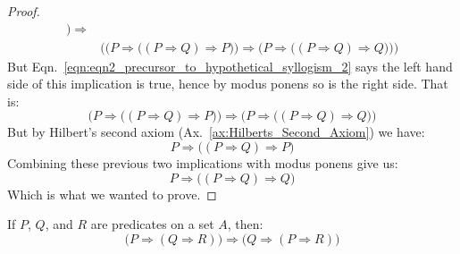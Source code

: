 \begin{proof}
\begin{equation}
\begin{split}
                \Big)
                \Rightarrow\\
                &\bigg(
                    \Big(
                        P\Rightarrow
                        \big(
                            (P\Rightarrow{Q})\Rightarrow{P}
                        \big)
                    \Big)
                    \Rightarrow
                    \Big(
                        P\Rightarrow
                        \big(
                            (P\Rightarrow{Q})\Rightarrow{Q}
                        \big)
                    \Big)
                \bigg)
            \end{split}
        \end{equation}
        But Eqn.~\ref{eqn:eqn2_precursor_to_hypothetical_syllogism_2} says the
        left hand side of this implication is true, hence by modus ponens so is
        the right side. That is:
        \begin{equation}
            \Big(
                P\Rightarrow
                \big(
                    (P\Rightarrow{Q})\Rightarrow{P}
                \big)
            \Big)
            \Rightarrow
            \Big(
                P\Rightarrow
                \big(
                    (P\Rightarrow{Q})\Rightarrow{Q}
                \big)
            \Big)
        \end{equation}
        But by Hilbert's second axiom (Ax.~\ref{ax:Hilberts_Second_Axiom}) we
        have:
        \begin{equation}
            P\Rightarrow\big((P\Rightarrow{Q})\Rightarrow{P}\big)
        \end{equation}
        Combining these previous two implications with modus ponens give us:
        \begin{equation}
            P\Rightarrow
            \big(
                (P\Rightarrow{Q})\Rightarrow{Q}
            \big)
        \end{equation}
        Which is what we wanted to prove.
    \end{proof}
    \begin{theorem}
        \label{thm:precursor_to_hypothetical_syllogism_2}%
        If $P$, $Q$, and $R$ are predicates on a set $A$, then:
        \begin{equation*}
            \big(P\Rightarrow(Q\Rightarrow{R})\big)
            \Rightarrow\big(Q\Rightarrow(P\Rightarrow{R})\big)
        \end{equation*}
    \end{theorem}
